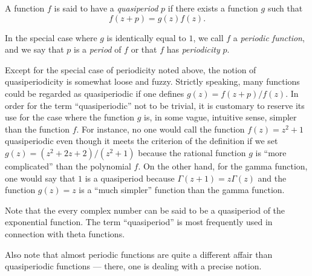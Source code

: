 \documentclass[12pt]{article}
\begin{document}

A function $f$ is said to have a \emph{quasiperiod} $p$ if there exists a function $g$ such that
 $$f(z + p) = g(z) f(z).$$

In the special case where $g$ is identically equal to $1$, we call $f$ a \emph{periodic function}, and we say that $p$ is a \emph{period} of $f$ or that $f$ has \emph{periodicity} $p$.

Except for the special case of periodicity noted above, the notion of quasiperiodicity is somewhat loose and fuzzy.  Strictly speaking, many functions could be regarded as quasiperiodic if one defines $g(z) = f(z+p) / f(z)$.  In order for the term ``quasiperiodic'' not to be trivial, it is customary to reserve its use for the case where the function $g$ is, in some vague, intuitive sense, simpler than the function $f$.  For instance, no one would call the function $f(z) = z^2 + 1$ quasiperiodic even though it meets the criterion of the definition if we set $g(z) = (z^2 + 2z + 2) / (z^2 + 1)$ because the rational function $g$ is ``more complicated'' than the polynomial $f$.  On the other hand, for the gamma function, one would say that $1$ is a quasiperiod because $\Gamma (z+1) = z \Gamma(z)$ and the function $g(z) = z$ is a ``much simpler'' function than the gamma function.

Note that the every complex number can be said to be a quasiperiod of the exponential function.  The term ``quasiperiod'' is most frequently used in connection with theta functions.

Also note that almost periodic functions are quite a different affair than quasiperiodic functions --- there, one is dealing with a precise notion.
\end{document}
